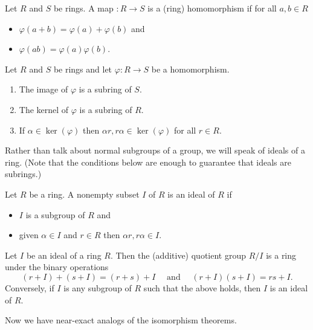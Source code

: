 \documentclass[../m171main.tex]{subfiles}
\begin{document}
\begin{definition}[Homomorphism]
    Let $R$ and $S$ be rings.
    A map $ : R \to S$ is a (ring) homomorphism if for all $a,b \in R$
    \begin{itemize}[topsep=0pt]
        \item $\varphi(a + b) = \varphi(a) + \varphi(b)$ and
        \item $\varphi(ab) = \varphi(a)\varphi(b)$.
    \end{itemize}
\end{definition}

\begin{theorem}[]
    Let $R$ and $S$ be rings and let $\varphi : R \to S$ be a homomorphism.
    \begin{enumerate}[label=(\alph*),topsep=0pt]
        \item The image of $\varphi$ is a subring of $S$.
        \item The kernel of $\varphi$ is a subring of $R$.
        \item If $\alpha \in \ker(\varphi)$ then $\alpha r, r\alpha \in \ker(\varphi)$ for all $r \in R$.
    \end{enumerate}
\end{theorem}

Rather than talk about normal subgroups of a group, we will speak of ideals of a ring.
(Note that the conditions below are enough to guarantee that ideals are subrings.)

\begin{definition}[Ideal]
    Let $R$ be a ring.
    A nonempty subset $I$ of $R$ is an ideal of $R$ if
    \begin{itemize}[topsep=0pt]
        \item $I$ is a subgroup of $R$ and
        \item given $\alpha \in I$ and $r \in R$ then $\alpha r, r \alpha \in I$.
    \end{itemize}
\end{definition}

\begin{theorem}[]
    Let $I$ be an ideal of a ring $R$.
    Then the (additive) quotient group $R / I$ is a ring under the binary operations
    \[ (r+I) + (s+I) = (r+s)+I \quad\text{ and }\quad (r+I) (s+I) = rs + I. \]
    Conversely, if $I$ is any subgroup of $R$ such that the above holds, then $I$ is an ideal of $R$.
\end{theorem}

Now we have near-exact analogs of the isomorphism theorems.
\end{document}
